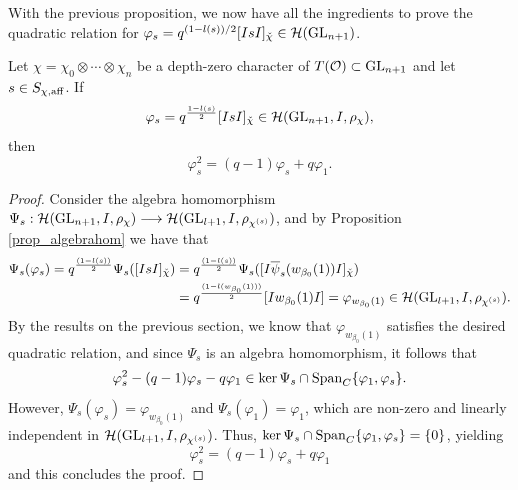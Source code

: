     With the previous proposition, we now have all the ingredients to prove the quadratic relation for $\varphi_s=q^{(1-l(s))/2}[IsI]_{\check{\chi}}\in\mathcal{H}(\mathrm{GL}_{n+1})$. 

    \begin{theorem}
        Let $\chi=\chi_0\otimes\cdots\otimes\chi_n$ be a depth-zero character of $T(\mathcal{O})\subset\mathrm{GL}_{n+1}$ and let $s\in S_{\chi,\mathrm{aff}}$. If $$\varphi_s=q^{\frac{1-l(s)}{2}}[IsI]_{\check{\chi}}\in\mathcal{H}(\mathrm{GL}_{n+1},I,\rho_\chi),$$
        then
        $$\varphi_s^2=(q-1)\varphi_s+q\varphi_1.$$
    \end{theorem}
    \begin{proof}
        Consider the algebra homomorphism $\Psi_s:\mathcal{H}(\mathrm{GL}_{n+1},I,\rho_\chi)\longrightarrow\mathcal{H}(\mathrm{GL}_{l+1},I,\rho_{\chi^{(s)}})$, and by Proposition \ref{prop_algebrahom} we have that 
        \begin{align*}
            \Psi_s(\varphi_s)=q^{\frac{(1-l(s))}{2}}\Psi_s([IsI]_{\check{\chi}})&=q^{\frac{(1-l(s))}{2}}\Psi_s([I\overline{\psi}_s(w_{\beta_0}(1))I]_{\check{\chi}})\\
            &=q^{\frac{(1-l(w_{\beta_0}(1)))}{2}}[Iw_{\beta_0}(1)I]=\varphi_{w_{\beta_0}(1)}\in\mathcal{H}(\mathrm{GL}_{l+1},I,\rho_{\chi^{(s)}}).
        \end{align*}
        By the results on the previous section, we know that $\varphi_{w_{\beta_0}(1)}$ satisfies the desired quadratic relation, and since $\Psi_s$ is an algebra homomorphism, it follows that 
        $$\varphi_s^2-(q-1)\varphi_s-q\varphi_1\in\ker\Psi_s\cap \mathrm{Span}_C\{\varphi_1,\varphi_s\}.$$
        However, $\Psi_s(\varphi_s)=\varphi_{w_{\beta_0}(1)}$ and $\Psi_s(\varphi_1)=\varphi_1$, which are non-zero and linearly independent in $\mathcal{H}(\mathrm{GL}_{l+1},I,\rho_{\chi^{(s)}})$. Thus, $\ker\Psi_s\cap \mathrm{Span}_C\{\varphi_1,\varphi_s\}=\{0\}$, yielding  
        $$\varphi_s^2=(q-1)\varphi_s+q\varphi_1$$
        and this concludes the proof.
    \end{proof}
